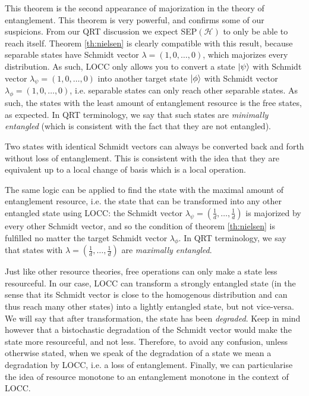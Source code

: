 
This theorem is the second appearance of majorization in the theory of entanglement. This theorem is very powerful, and confirms some of our suspicions. From our QRT discussion we expect SEP$(\mathcal{H})$ to only be able to reach itself. Theorem \ref{th:nielsen} is clearly compatible with this result, because separable states have Schmidt vector $\lambda = (1, 0, \dots, 0)$, which majorizes every distribution. As such, LOCC only allows you to convert a state $\ket{\psi}$ with Schmidt vector $\lambda_\psi = (1, 0, \dots, 0)$ into another target state $\ket{\phi}$ with Schmidt vector $\lambda_\phi = (1, 0, \dots, 0)$, i.e. separable states can only reach other separable states. As such, the states with the least amount of entanglement resource is the free states, as expected. In QRT terminology, we say that such states are \textit{minimally entangled} (which is consistent with the fact that they are not entangled). 

\begin{remark}
    Two states with identical Schmidt vectors can always be converted back and forth without loss of entanglement. This is consistent with the idea that they are equivalent up to a local change of basis which is a local operation.
\end{remark}

The same logic can be applied to find the state with the maximal amount of entanglement resource, i.e. the state that can be transformed into any other entangled state using LOCC: the Schmidt vector $\lambda_\psi = \left(\frac{1}{d}, \dots, \frac{1}{d}\right)$ is majorized by every other Schmidt vector, and so the condition of theorem \ref{th:nielsen} is fulfilled no matter the target Schmidt vector $\lambda_\phi$. In QRT terminology, we say that states with $\lambda = \left(\frac{1}{d}, \dots, \frac{1}{d}\right)$ are \textit{maximally entangled}.

Just like other resource theories, free operations can only make a state less resourceful. In our case, LOCC can transform a strongly entangled state (in the sense that its Schmidt vector is close to the homogenous distribution and can thus reach many other states) into a lightly entangled state, but not vice-versa. We will say that after transformation, the state has been \textit{degraded}. Keep in mind however that a bistochastic degradation of the Schmidt vector would make the state more resourceful, and not less. Therefore, to avoid any confusion, unless otherwise stated, when we speak of the degradation of a state we mean a degradation by LOCC, i.e. a loss of entanglement. Finally, we can particularise the idea of resource monotone to an entanglement monotone in the context of LOCC.

